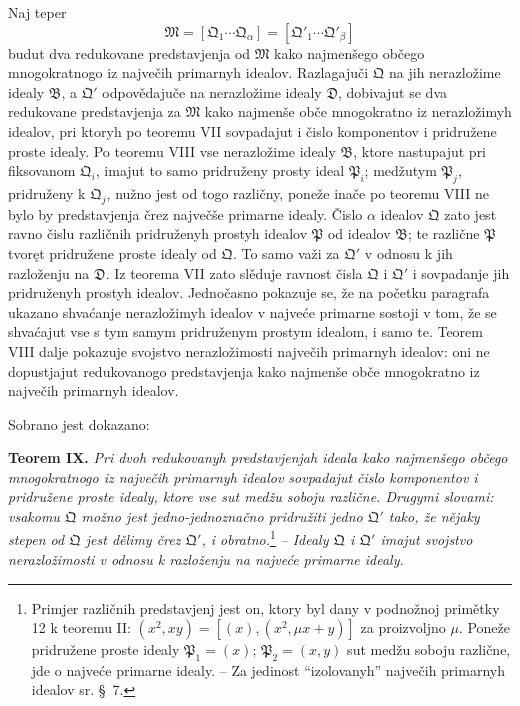 \documentclass[11pt]{article}
\newcommand{\ideal}[1]{\mathfrak{#1}}
\begin{document}
Naj teper
\[
 \ideal M=[\ideal Q_1\cdots\ideal Q_\alpha]=[\ideal Q'_1\cdots\ideal Q'_\beta]
\]
budut dva redukovane predstavjenja od \(\ideal M\) kako najmenšego občego mnogokratnogo iz največih primarnyh idealov. Razlagajuči \(\ideal Q\) na jih nerazložime idealy \(\ideal B\), a \(\ideal Q'\) odpovědajuče na nerazložime idealy \(\ideal D\), dobivajut se dva redukovane predstavjenja za \(\ideal M\) kako najmenše obče mnogokratno iz nerazložimyh idealov, pri ktoryh po teoremu VII sovpadajut i čislo komponentov i pridružene proste idealy. Po teoremu VIII vse nerazložime idealy \(\ideal B\), ktore nastupajut pri fiksovanom \(\ideal Q_i\), imajut to samo pridruženy prosty ideal \(\ideal P_i\); medžutym \(\ideal P_j\), pridruženy k \(\ideal Q_j\), nužno jest od togo različny, poneže inače po teoremu VIII ne bylo by predstavjenja črez največše primarne idealy. Čislo \(\alpha\) idealov \(\ideal Q\) zato jest ravno čislu različnih pridruženyh prostyh idealov \(\ideal P\) od idealov \(\ideal B\); te različne \(\ideal P\) tvoręt pridružene proste idealy od \(\ideal Q\). To samo važi za \(\ideal Q'\) v odnosu k jih razloženju na \(\ideal D\). Iz teorema VII zato slěduje ravnost čisla \(\ideal Q\) i \(\ideal Q'\) i sovpadanje jih pridruženyh prostyh idealov. Jednočasno pokazuje se, že na početku paragrafa ukazano shvaćanje nerazložimyh idealov v najveće primarne sostoji v tom, že se shvaćajut vse s tym samym pridruženym prostym idealom, i samo te. Teorem VIII dalje pokazuje svojstvo nerazložimosti največih primarnyh idealov: oni ne dopustjajut redukovanogo predstavjenja kako najmenše obče mnogokratno iz največih primarnyh idealov.

Sobrano jest dokazano:

\textbf{Teorem IX.} \emph{Pri dvoh redukovanyh predstavjenjah ideala kako najmenšego občego mnogokratnogo iz največih primarnyh idealov sovpadajut čislo komponentov i pridružene proste idealy, ktore vse sut medžu soboju različne. Drugymi slovami: vsakomu \(\ideal Q\) možno jest jedno-jednoznačno pridružiti jedno \(\ideal Q'\) tako, že nějaky stepen od \(\ideal Q\) jest dělimy črez \(\ideal Q'\), i obratno.}\footnote{Primjer različnih predstavjenj jest on, ktory byl dany v podnožnoj primětky 12 k teoremu II: \((x^2,xy)=[(x),(x^2,\mu x+y)]\) za proizvoljno \(\mu\). Poneže pridružene proste idealy \(\ideal P_1=(x)\); \(\ideal P_2=(x,y)\) sut medžu soboju različne, jde o najveće primarne idealy. -- Za jedinost ``izolovanyh'' največih primarnyh idealov sr. \S~7.} \emph{-- Idealy \(\ideal Q\) i \(\ideal Q'\) imajut svojstvo nerazložimosti v odnosu k razloženju na najveće primarne idealy.}
\end{document}
